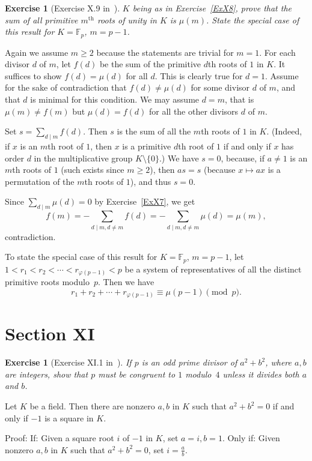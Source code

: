 \documentclass[12pt,letterpaper]{article}
\newcommand{\F}{\mathbb{F}}
\newtheorem{exer}[thm]{Exercise}
\theoremstyle{definition}
\begin{document}
\begin{exer}[Exercise X.9 in~\cite{weil1979}]
$K$ being as in Exercise~\ref{ExX8}, prove that the sum of all primitive $m^{\text{th}}$ roots of unity in $K$ is $\mu(m)$. State the special case of this result for $K=\F_p$, $m=p-1$.
\end{exer}

Again we assume $m\ge2$ because the statements are trivial for $m=1$. For each divisor $d$ of $m$, let $f(d)$ be the sum of the primitive $d$th roots of $1$ in $K$. It suffices to show $f(d)=\mu(d)$ for all $d$. This is clearly true for $d=1$. Assume for the sake of contradiction that $f(d)\ne\mu(d)$ for some divisor $d$ of $m$, and that $d$ is minimal for this condition. We may assume $d=m$, that is $\mu(m)\ne f(m)$ but $\mu(d)=f(d)$ for all the other divisors $d$ of $m$. 

Set $s=\sum_{d\mid m}f(d)$. Then $s$ is the sum of all the $m$th roots of $1$ in $K$. (Indeed, if $x$ is an $m$th root of $1$, then $x$ is a primitive $d$th root of $1$ if and only if $x$ has order $d$ in the multiplicative group $K\setminus\{0\}$.) We have $s=0$, because, if $a\ne1$ is an $m$th roots of $1$ (such exists since $m\ge2$), then $as=s$ (because $x\mapsto ax$ is a permutation of the $m$th roots of $1$), and thus $s=0$. 

Since $\sum_{d\mid m}\mu(d)=0$ by Exercise~\ref{ExX7}, we get 
$$
f(m)=-\sum_{d\mid m,d\ne m}f(d)=-\sum_{d\mid m,d\ne m}\mu(d)=\mu(m),
$$ 
contradiction. 

To state the special case of this result for $K=\F_p$, $m=p-1$, let $1<r_1<r_2<\cdots<r_{\varphi(p-1)}<p$ be a system of representatives of all the distinct primitive roots modulo~$p$. Then we have 
$$
r_1+r_2+\cdots+r_{\varphi(p-1)}\equiv\mu(p-1)\pmod{p}.
$$

\section{Section XI} %

\begin{exer}[Exercise XI.1 in~\cite{weil1979}]
If $p$ is an odd prime divisor of $a^2+b^2$, where $a,b$ are integers, show that $p$ must be congruent to $1$ modulo~$4$ unless it divides both $a$ and $b$.
\end{exer}

Let $K$ be a field. Then there are nonzero $a,b$ in $K$ such that $a^2+b^2=0$ if and only if $-1$ is a square in $K$. 

Proof: If: Given a square root $i$ of $-1$ in $K$, set $a=i, b=1$. Only if: Given nonzero $a, b$ in $K$ such that $a^2+b^2=0$, set $i=\frac{a}{b}$. 
\end{document}
